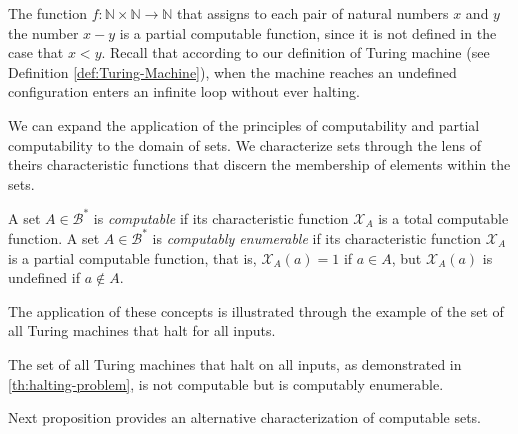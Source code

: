 \begin{example}
The function $f: \mathbb{N} \times \mathbb{N} \rightarrow \mathbb{N}$ that assigns to each pair of natural numbers $x$ and $y$ the number $x - y$ is a partial computable function, since it is not defined in the case that $x < y$. Recall that according to our definition of Turing machine (see Definition \ref{def:Turing-Machine}), when the machine reaches an undefined configuration enters an infinite loop without ever halting.
\end{example}

We can expand the application of the principles of computability and partial computability to the domain of sets. We characterize sets through the lens of theirs characteristic functions that discern the membership of elements within the sets.

\begin{definition}
A set $A \in \mathcal{B}^\ast$ is \emph{computable} if its characteristic function $\mathcal{X}_A$ is a total computable function. A set $A \in \mathcal{B}^\ast$ is \emph{computably enumerable} if its characteristic function $\mathcal{X}_A$ is a partial computable function, that is, $\mathcal{X}_A(a) = 1$ if $a \in A$, but $\mathcal{X}_A(a)$ is undefined if $a \not\in A$.
\end{definition}

The application of these concepts is illustrated through the example of the set of all Turing machines that halt for all inputs.

\begin{example}
The set of all Turing machines that halt on all inputs, as demonstrated in \ref{th:halting-problem}, is not computable but is computably enumerable.
\end{example}

Next proposition provides an alternative characterization of computable sets.

